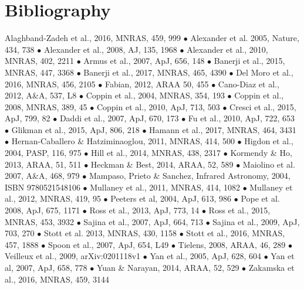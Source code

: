 
\normalsize 
\section*{Bibliography}
\vspace{-8pt}
Alaghband-Zadeh et al., 2016, MNRAS, 459, 999 $\bullet$
Alexander et al. 2005, Nature, 434, 738  $\bullet$
Alexander et al., 2008, AJ, 135, 1968	 $\bullet$
Alexander et al., 2010, MNRAS, 402, 2211 $\bullet$
Armus et al., 2007, ApJ, 656, 148 $\bullet$
Banerji et al., 2015, MNRAS, 447, 3368 $\bullet$
Banerji et al., 2017, MNRAS, 465, 4390 $\bullet$
Del Moro et al., 2016, MNRAS, 456, 2105 $\bullet$
Fabian, 2012, ARAA 50, 455 $\bullet$ 
Cano-Diaz et al., 2012, A\&A, 537, L8 $\bullet$  
Coppin et al., 2004, MNRAS, 354, 193 $\bullet$
Coppin et al., 2008, MNRAS, 389, 45 $\bullet$
Coppin et al., 2010, ApJ, 713, 503 $\bullet$
Cresci et al., 2015, ApJ, 799, 82 $\bullet$
Daddi et al., 2007, ApJ, 670, 173	$\bullet$
Fu et al., 2010, ApJ, 722, 653 	$\bullet$
Glikman et al., 2015, ApJ, 806, 218 $\bullet$
Hamann et al., 2017, MNRAS, 464, 3431 $\bullet$
Hernan-Caballero \& Hatziminaoglou, 2011, MNRAS, 414, 500	$\bullet$
Higdon et al., 2004, PASP, 116, 975 $\bullet$
Hill et al., 2014, MNRAS, 438, 2317 $\bullet$
Kormendy \& Ho, 2013, ARAA, 51, 511 $\bullet$
Heckman \& Best, 2014, ARAA, 52, 589  $\bullet$
Maiolino et al. 2007, A\&A, 468, 979 $\bullet$
Mampaso, Prieto \& Sanchez, Infrared Astronomy, 2004, ISBN  9780521548106 $\bullet$
Mullaney et al., 2011, MNRAS, 414, 1082  $\bullet$
Mullaney et al., 2012, MNRAS, 419, 95 $\bullet$
Peeters et al, 2004, ApJ, 613, 986 $\bullet$
Pope et al. 2008, ApJ, 675, 1171 $\bullet$
Ross et al., 2013, ApJ, 773, 14 $\bullet$
Ross et al., 2015, MNRAS, 453, 3932 $\bullet$
Sajina et al., 2007, ApJ, 664, 713 $\bullet$
Sajina et al., 2009, ApJ, 703, 270 $\bullet$
Stott et al. 2013, MNRAS, 430, 1158 $\bullet$
Stott et al., 2016, MNRAS, 457, 1888 $\bullet$
Spoon et al., 2007, ApJ, 654, L49 $\bullet$
Tielens, 2008, ARAA, 46, 289  $\bullet$
Veilleux et al., 2009, arXiv:0201118v1 $\bullet$
Yan et al., 2005, ApJ, 628, 604 $\bullet$
Yan et al, 2007, ApJ, 658, 778 $\bullet$
Yuan \& Narayan, 2014, ARAA, 52, 529 $\bullet$
Zakamska et al., 2016, MNRAS, 459, 3144 

\normalsize
